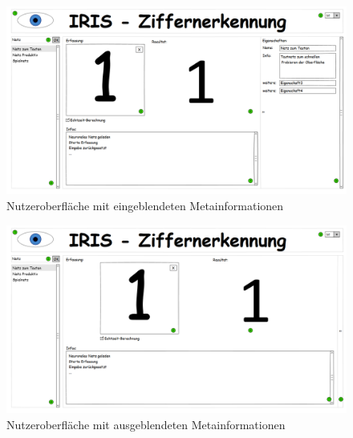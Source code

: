 \begin{figure}[H]
 
 	\centering
 	\includegraphics[height=0.75\textwidth, angle=90]{Abbildungen/UI-Mocks/Main-Ui.png}
 	\caption{Nutzeroberfläche mit eingeblendeten Metainformationen}
 	\label{ui-max}
\end{figure}

\begin{figure}[H]
	\centering
	\includegraphics[height=0.75\textwidth, angle=90]{Abbildungen/UI-Mocks/Main-Ui-Minimized.png}
	\caption{Nutzeroberfläche mit ausgeblendeten Metainformationen}
	\label{ui-min}
\end{figure}

